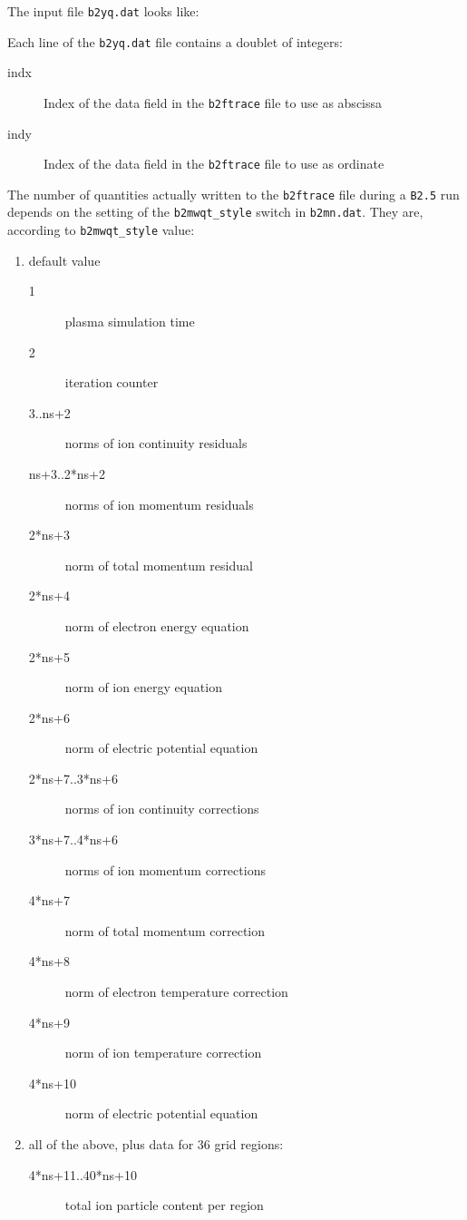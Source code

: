 \documentclass[a4paper,10pt]{report}
\begin{document}
The input file {\tt b2yq.dat} looks like:

Each line of the {\tt b2yq.dat} file contains a doublet of integers:
\begin{description}
  \item[indx] Index of the data field in the {\tt b2ftrace} file to use as abscissa
  \item[indy] Index of the data field in the {\tt b2ftrace} file to use as ordinate
\end{description}

The number of quantities actually written to the {\tt b2ftrace} file during a
{\tt B2.5} run depends on the setting of the {\tt b2mwqt\_style} switch in {\tt b2mn.dat}.
They are, according to {\tt b2mwqt\_style} value:
\begin{enumerate}
  \item[style=1] default value
    \begin{description}
      \item[1] plasma simulation time
      \item[2] iteration counter
      \item[3..ns+2] norms of ion continuity residuals
      \item[ns+3..2*ns+2] norms of ion momentum residuals
      \item[2*ns+3] norm of total momentum residual
      \item[2*ns+4] norm of electron energy equation
      \item[2*ns+5] norm of ion energy equation
      \item[2*ns+6] norm of electric potential equation
      \item[2*ns+7..3*ns+6] norms of ion continuity corrections
      \item[3*ns+7..4*ns+6] norms of ion momentum corrections
      \item[4*ns+7] norm of total momentum correction
      \item[4*ns+8] norm of electron temperature correction
      \item[4*ns+9] norm of ion temperature correction
      \item[4*ns+10] norm of electric potential equation
    \end{description}
  \item[style=2] all of the above, plus data for 36 grid regions:
    \begin{description}
      \item[ 4*ns+11..40*ns+10] total ion particle content per region

\end{description}
\end{enumerate}
\end{document}
